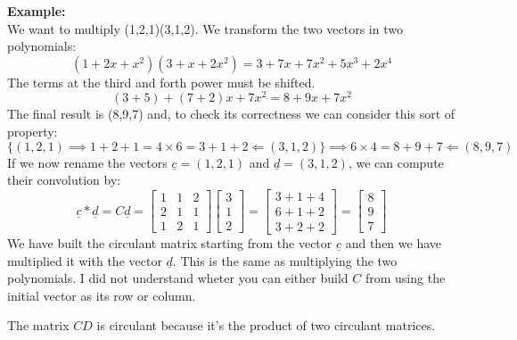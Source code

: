 \noindent \textbf{Example:}\\
We want to multiply (1,2,1)(3,1,2). We transform the two vectors in two polynomials:
\[
    (1 + 2x + x^2)(3 + x + 2x^2) = 3 + 7x + 7x^2 + 5x^3 + 2x^4    
\]
The terms at the third and forth power must be shifted. 
\[
    (3 + 5) + (7 + 2)x + 7x^2 = 8 + 9x + 7x^2     
\]
The final result is (8,9,7) and, to check its correctness we can consider this sort of property:
\[
    \{(1,2,1) \implies 1+2+1 =4 \times 6 = 3+1+2 \Longleftarrow  (3,1,2) \} \implies 6 \times 4 = 8+9+7 \Longleftarrow  (8,9,7)     
\] 
If we now rename the vectors $\underline{c} = (1,2,1)$ and $\underline{d} = (3,1,2)$, we can compute their convolution by:
\[
    \underline{c} * \underline{d} =     
C\underline{d} = \begin{bmatrix}
        1 & 1 & 2\\
        2 & 1 & 1\\
        1 & 2 & 1
    \end{bmatrix} \begin{bmatrix}
        3\\
        1\\
        2
    \end{bmatrix} = \begin{bmatrix}
        3+1+4\\
        6+1+2\\
        3+2+2
    \end{bmatrix} = \begin{bmatrix}
        8\\
        9\\
        7
    \end{bmatrix}
\]
We have built the circulant matrix starting from the vector $\underline{c}$ and then we have multiplied it with the vector $\underline{d}$. This is the same as multiplying the two polynomials. I did not understand wheter you can either build $C$ from using the initial vector as its row or column.

The matrix $CD$ is circulant because it's the product of two circulant matrices. 

